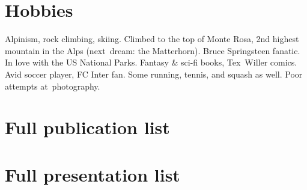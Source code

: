 \section{Hobbies}
Alpinism, rock climbing, skiing. Climbed to the top of Monte Rosa, 2nd highest mountain in the Alps (next~dream: the Matterhorn). Bruce Springsteen fanatic. In love with the US National Parks. Fantasy \& sci-fi books, Tex~Willer comics. Avid soccer player, FC Inter fan. Some running, tennis, and squash as well. Poor attempts at~photography.


\pagebreak
\section{Full publication list}\vspace{0.2cm} 



\pagebreak
\section{Full presentation list}\vspace{0.2cm} 




